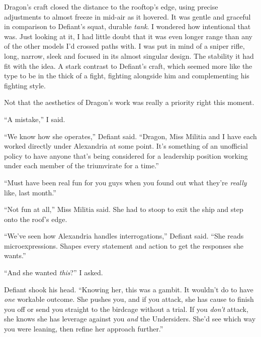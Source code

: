 





Dragon's craft closed the distance to the rooftop's edge, using precise adjustments to almost freeze in mid-air as it hovered.  It was gentle and graceful in comparison to Defiant's squat, durable \emph{tank}.  I wondered how intentional that was.  Just looking at it, I had little doubt that it was even longer range than any of the other models I'd crossed paths with.  I was put in mind of a sniper rifle, long, narrow, sleek and focused in its almost singular design.  The stability it had fit with the idea.  A stark contrast to Defiant's craft, which seemed more like the type to be in the thick of a fight, fighting alongside him and complementing his fighting style.



Not that the aesthetics of Dragon's work was really a priority right this moment.



``A mistake,'' I said.



``We know how she operates,'' Defiant said.  ``Dragon, Miss Militia and I have each worked directly under Alexandria at some point.  It's something of an unofficial policy to have anyone that's being considered for a leadership position working under each member of the triumvirate for a time.''



``Must have been real fun for you guys when you found out what they're \emph{really} like, last month.''



``Not fun at all,'' Miss Militia said.  She had to stoop to exit the ship and step onto the roof's edge.



``We've seen how Alexandria handles interrogations,'' Defiant said.  ``She reads microexpressions.  Shapes every statement and action to get the responses she wants.''



``And she wanted \emph{this}?'' I asked.



Defiant shook his head.  ``Knowing her, this was a gambit.  It wouldn't do to have \emph{one} workable outcome.  She pushes you, and if you attack, she has cause to finish you off or send you straight to the birdcage without a trial.  If you \emph{don't} attack, she knows she has leverage against you \emph{and} the Undersiders.  She'd see which way you were leaning, then refine her approach further.''




